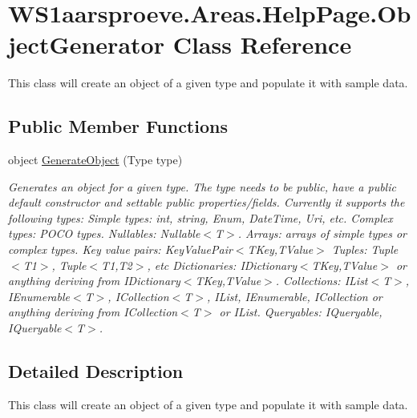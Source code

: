 \hypertarget{class_w_s1aarsproeve_1_1_areas_1_1_help_page_1_1_object_generator}{}\section{W\+S1aarsproeve.\+Areas.\+Help\+Page.\+Object\+Generator Class Reference}
\label{class_w_s1aarsproeve_1_1_areas_1_1_help_page_1_1_object_generator}


This class will create an object of a given type and populate it with sample data.  


\subsection*{Public Member Functions}
\begin{DoxyCompactItemize}
\item 
object \hyperlink{class_w_s1aarsproeve_1_1_areas_1_1_help_page_1_1_object_generator_ac9ee0b5d7e70f42b70a0785d17b661a7}{Generate\+Object} (Type type)
\begin{DoxyCompactList}\small\item\em Generates an object for a given type. The type needs to be public, have a public default constructor and settable public properties/fields. Currently it supports the following types\+: Simple types\+: int, string, Enum, Date\+Time, Uri, etc. Complex types\+: P\+O\+C\+O types. Nullables\+: Nullable$<$\+T$>$. Arrays\+: arrays of simple types or complex types. Key value pairs\+: Key\+Value\+Pair$<$\+T\+Key,\+T\+Value$>$ Tuples\+: Tuple$<$\+T1$>$, Tuple$<$\+T1,\+T2$>$, etc Dictionaries\+: I\+Dictionary$<$\+T\+Key,\+T\+Value$>$ or anything deriving from I\+Dictionary$<$\+T\+Key,\+T\+Value$>$. Collections\+: I\+List$<$\+T$>$, I\+Enumerable$<$\+T$>$, I\+Collection$<$\+T$>$, I\+List, I\+Enumerable, I\+Collection or anything deriving from I\+Collection$<$\+T$>$ or I\+List. Queryables\+: I\+Queryable, I\+Queryable$<$\+T$>$. \end{DoxyCompactList}\end{DoxyCompactItemize}


\subsection{Detailed Description}
This class will create an object of a given type and populate it with sample data. 



